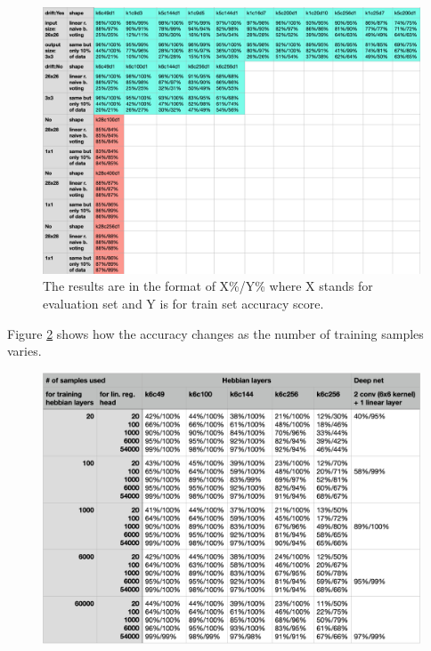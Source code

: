 \documentclass[12pt]{article}
\begin{document}
\begin{figure}[!htbp]
	\centering
	\includegraphics[width=13.8cm]{benchmarks_votes}
	\caption{The results are in the format of X\%/Y\%  where X stands for evaluation set and Y is for train set accuracy score.}
	\label{fig:benchmarks_votes}
\end{figure} 

Figure \ref{fig:lin_reg_over_sample_size} shows how the accuracy changes as the number of training samples varies.


\begin{figure}[!htbp]
	\centering
	\includegraphics[width=13.8cm]{lin_reg_over_sample_size}
	\caption{}
	\label{fig:lin_reg_over_sample_size}
\end{figure} 
\end{document}
